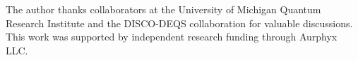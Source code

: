\documentclass[aps,prl,twocolumn,superscriptaddress]{revtex4-2}
\theoremstyle{plain}
\theoremstyle{definition}
\begin{document}
\begin{acknowledgments}
The author thanks collaborators at the University of Michigan Quantum Research 
Institute and the DISCO-DEQS collaboration for valuable discussions. This work 
was supported by independent research funding through Aurphyx LLC.
\end{acknowledgments}






\end{document}
